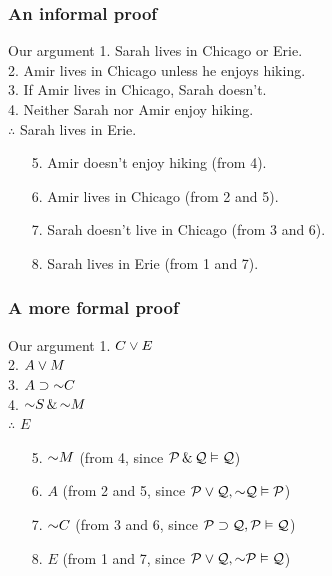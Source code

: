 \begin{frame}
  \frametitle{An informal proof}

  \begin{block}{Our argument}
  1. Sarah lives in Chicago or Erie.\\
  2. Amir lives in Chicago unless he enjoys hiking.\\
  3. If Amir lives in Chicago, Sarah doesn't.\\
  4. Neither Sarah nor Amir enjoy hiking.\\
  $\therefore$ Sarah lives in Erie.
  \end{block}

  \begin{enumerate}[<+->]
    \item[5.] Amir doesn't enjoy hiking (from 4).
    \item[6.] Amir lives in Chicago (from 2 and 5).
    \item[7.] Sarah doesn't live in Chicago (from 3 and 6).
    \item[8.] Sarah lives in Erie (from 1 and 7).
  \end{enumerate}

\end{frame}

\begin{frame}
  \frametitle{A more formal proof}

  \begin{block}{Our argument}
    1. \alert<4>{$C \vee E$}\\
    2. \alert<2>{$A \vee M$}\\
    3. \alert<3>{$A \eif \enot C$}\\
    4. \alert<1>{$\enot S \eand \enot M$} \\
  $\therefore$ $E$
  \end{block}

  \begin{enumerate}[<+->]
    \item[5.] \alert<1,2>{$\enot M$} (from 4, since $\mathcal{P} \,\&\, \mathcal{Q}
    \vDash \mathcal{Q}$)
    \item[6.] \alert<2,3>{$A$} (from 2 and 5, since $\metav{P} \eor \metav{Q}, \enot \metav{Q} \entails \metav{P}$)
    \item[7.] \alert<3,4>{$\enot C$} (from 3 and 6, since $\mathcal{P} \supset \mathcal{Q}, \mathcal{P}
    \vDash \mathcal{Q}$)
    \item[8.] \alert<4>{$E$} (from 1 and 7, since $\metav{P} \eor \metav{Q}, \enot \metav{P}
    \entails \metav{Q}$)
  \end{enumerate}

\end{frame}

